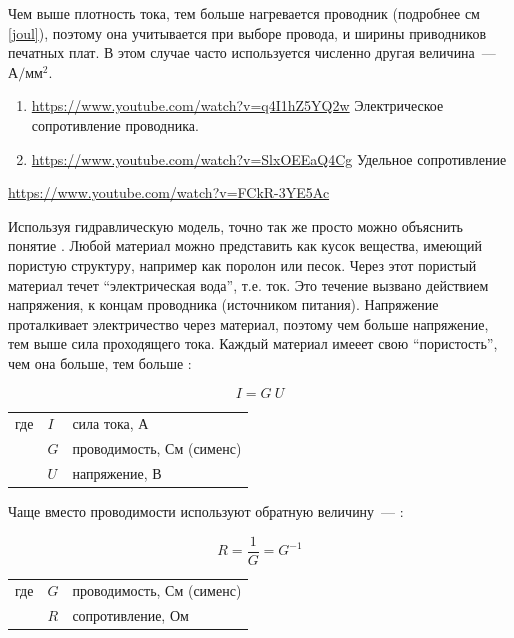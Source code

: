 Чем выше плотность тока, тем больше нагревается проводник (подробнее см
\ref{joul}), поэтому она учитывается при выборе провода, и ширины приводников
печатных плат. В этом случае часто используется численно другая величина\ ---
$\mbox{А}/\mbox{мм}^{2}$.

\label{bcohm}

\begin{youtube}
\begin{enumerate}[nosep]
  \item \url{https://www.youtube.com/watch?v=q4I1hZ5YQ2w}
Электрическое сопротивление проводника.    
  \item \url{https://www.youtube.com/watch?v=SlxOEEaQ4Cg}
Удельное сопротивление 
\end{enumerate}

\url{https://www.youtube.com/watch?v=FCkR-3YE5Ac}

\end{youtube}

Используя гидравлическую модель, точно так же просто можно объяснить понятие
. Любой материал можно представить как
кусок вещества, имеющий пористую структуру, например как поролон или песок.
Через этот пористый материал течет ``электрическая вода'', т.е. ток. Это течение
вызвано действием напряжения,  к концам проводника
(источником питания). Напряжение проталкивает электричество через материал,
поэтому чем больше напряжение, тем выше сила проходящего тока. Каждый материал
имееет свою ``пористость'', чем она больше, тем больше :

\begin{framed}
\begin{equation}\label{igu}
I = G \ U
\end{equation}
\begin{tabular}{l l l}
где & $I$ & сила тока, А \\
& $G$ & проводимость, См (сименс) \\
& $U$ & напряжение, В \\ 
\end{tabular}
\end{framed}

Чаще вместо проводимости используют обратную величину\ ---
:

\begin{framed}
\begin{equation}
R = \frac{1}{G} = G^{-1}
\end{equation}
\begin{tabular}{l l l}
где & $G$ & проводимость, См (сименс)\\
& $R$ & сопротивление, Ом\\
\end{tabular}
\end{framed}

